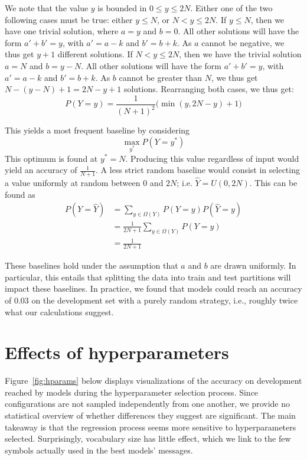 \documentclass[twocolumn]{article}
\begin{document}
We note that the value $y$ is bounded in $0 \leq y \leq 2N$. 
Either one of the two following cases must be true: either $y \leq N$, or $N < y \leq 2N$.
If  $y \leq N$, then we have one trivial solution, where $a=y$ and $b=0$. 
All other solutions will have the form $a'+b'=y$, with $a'=a-k$ and $b'=b+k$.
As $a$ cannot be negative, we thus get $y+1$ different solutions.
If $N < y \leq 2N$, then we have the trivial solution $a=N$ and $b=y-N$.
All other solutions will have the form $a'+b'=y$, with $a'=a-k$ and $b'=b+k$.
As $b$ cannot be greater than $N$, we thus get $N - (y - N) + 1= 2N - y + 1$ solutions.
Rearranging both cases, we thus get:
\begin{equation*}
    P(Y=y) = \frac{1}{(N+1)^2}\bigg(\min(y, 2N - y) + 1\bigg)
\end{equation*}

This yields a most frequent baseline by considering
\begin{equation*}
    \max_{y^*} P(Y=y^*)
\end{equation*}
This optimum is found at $y^*=N$. 
Producing this value regardless of input would yield an accuracy of $\frac{1}{N+1}$.
%
A less strict random baseline would consist in selecting a value uniformly at random between 0 and $2N$; i.e. $\hat{Y} =  U(0, 2N)$.
This can be found as
\begin{align*}
    P(Y=\hat{Y})    &= \sum_{y \in \Omega(Y)} P(Y=y)P(\hat{Y}=y) \\
                    &= \frac{1}{2N+1} \sum_{y \in \Omega(Y)} P(Y=y) \\
                    &= \frac{1}{2N+1}
\end{align*}

These baselines hold under the assumption that $a$ and $b$ are drawn uniformly.
In particular, this entails that splitting the data into train and test partitions will impact these baselines.
In practice, we found that models could reach an accuracy of $0.03$ on the development set with a purely random strategy, i.e., roughly twice what our calculations suggest.

\section{Effects of hyperparameters}

Figure~\ref{fig:hparams} below displays visualizations of the accuracy on development reached by models during the hyperparameter selection process. 
Since configurations are not sampled independently from one another, we provide no statistical overview of whether differences they suggest are significant.
The main takeaway is that the regression process seems more sensitive to hyperparameters selected.
Surprisingly, vocabulary size has little effect, which we link to the few symbols actually used in the best models' messages.
\end{document}
